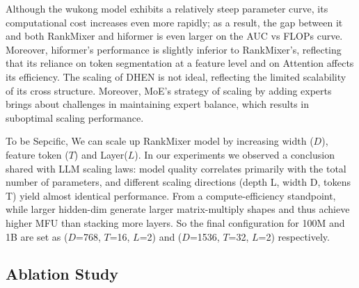 Although the wukong model exhibits a relatively steep parameter curve, its computational cost increases even more rapidly; as a result, the gap between it and both RankMixer and hiformer is even larger on the AUC vs FLOPs curve. Moreover, hiformer’s performance is slightly inferior to RankMixer’s, reflecting that its reliance on token segmentation at a feature level and on Attention affects its efficiency. The scaling of DHEN is not ideal, reflecting the limited scalability of its cross structure. Moreover, MoE’s strategy of scaling by adding experts brings about challenges in maintaining expert balance, which results in suboptimal scaling performance.

To be Sepcific, We can scale up RankMixer model by increasing width ($D$), feature token ($T$) and Layer($L$). In our experiments we observed a conclusion shared with LLM scaling laws: model quality correlates primarily with the total number of parameters, and different scaling directions (depth L, width D, tokens T) yield almost identical performance. From a compute-efficiency standpoint, while larger hidden-dim generate larger matrix-multiply shapes and thus achieve higher MFU than stacking more layers. So the final configuration for 100M and 1B are set as ($D$=768, $T$=16, $L$=2) and ($D$=1536, $T$=32, $L$=2) respectively.

\subsection{Ablation Study}




    
